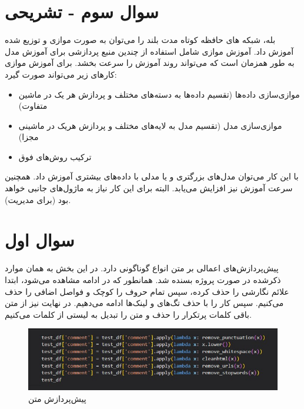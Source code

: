 \documentclass{article}
\begin{document}
\section{سوال سوم - تشریحی}
بله، شبکه های حافظه کوتاه مدت بلند را می‌توان به صورت موازی و توزیع شده آموزش داد. آموزش موازی شامل استفاده از چندین منبع پردازشی برای آموزش مدل به طور همزمان است که می‌تواند روند آموزش را سرعت بخشد. برای آموزش موازی کارهای زیر می‌تواند صورت گیرد:

\begin{itemize}
    \item موازی‌سازی داده‌ها (تقسیم داده‌ها به دسته‌های مختلف و پردازش هر یک در ماشین متفاوت)
    \item موازی‌سازی مدل (تقسیم مدل به لایه‌های مختلف و پردازش هریک در ماشینی مجزا)
    \item ترکیب روش‌های فوق
\end{itemize}

با این کار می‌توان مدل‌های بزرگتری و یا مدلی با داده‌های بیشتری آموزش داد. همچنین سرعت آموزش نیز افزایش می‌یابد. البته برای این کار نیاز به ماژول‌های جانبی خواهد بود (برای مدیریت).




\section{سوال اول}
پیش‌پردازش‌های اعمالی بر متن انواع گوناگونی دارد. در این بخش به همان موارد ذکرشده در صورت پروژه بسنده شد. همانطور که در ادامه مشاهده می‌شود، ابتدا علائم نگارشی را حذف کرده، سپس تمام حروف را کوچک و فواصل اضافی را حذف می‌کنیم. سپس کار را با حذف تگ‌های  و لینک‌ها ادامه می‌دهیم. در نهایت نیز از متن باقی کلمات پرتکرار را حذف و متن را تبدیل به لیستی از کلمات می‌کنیم.


\begin{figure}[!h]
    \centering\includegraphics[scale=.75]{./p1-1}
    \caption{پیش‌پردازش متن}\label{fig.11}
\end{figure}

\end{document}
